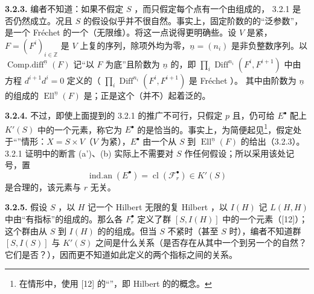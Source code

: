 \textbf{3.2.3.} 编者不知道：如果不假定 $S$ ，而只假定每个点有一个由组成的， 3.2.1 是否仍然成立。况且 $S$ 的假设似乎并不很自然。事实上，固定阶数的的“泛参数”，是一个 Fréchet 的一个（无限维）。将这一点说得更明确些。设 $V$ 是紧，$F=(F^i)_{i\in\mathbb Z}$ 是 $V$ 上复的序列，除项外均为零，$\underline n=(n_i)$ 是非负整数序列。以 $\operatorname{Comp.diff}^{\underline n}(F)$ 记“以 $F$ 为底”且阶数为 $\underline n$ 的，即 $\prod_i\operatorname{Diff}^{n_i}(F^i,F^{i+1})$ 中由方程 $d^{i+1}d^i=0$ 定义的（ $\prod_i\operatorname{Diff}^{n_i}(F^i,F^{i+1})$ 是 Fréchet ）。
其中由阶数为 $\underline n$ 的组成的 $\operatorname{Ell}^{\underline n}(F)$ 是；正是这个（并不）起着泛的。

\textbf{3.2.4.} 不过，即使上面提到的 3.2.1 的推广不可行，只假定 $p$ 且，仍可给 $E^\bullet$ 配上 $K'(S)$ 中的一个元素，称它为 $E^\bullet$ 的是恰当的。事实上，为简便起见\footnote{在情形中，使用 [12] 的“”，即 Hilbert 的的概念。}，假定处于“”情形：$X=S\times V$（$V$ 为紧），$E^\bullet$ 由一个从 $S$ 到 $\operatorname{Ell}^{\underline n}(F)$ 的给出（3.2.3）。3.2.1 证明中的断言 (a')、(b) 实际上不需要对 $S$ 作任何假设；所以采用该处记号，置
\[\operatorname{ind.an}(E^\bullet)=\operatorname{cl}(\mathcal F_r^\bullet)\in K'(S)\]
是合理的，该元素与 $r$ 无关。

\textbf{3.2.5.} 假设 $S$ ，以 $H$ 记一个 Hilbert 无限的复 Hilbert ，以 $I(H)$ 记 $L(H,H)$ 中由“有指标”的组成的。那么各 $F_r^\bullet$ 定义了群 $[S,I(H)]$ 中的一个元素（[12]）；这个群由从 $S$ 到 $I(H)$ 的的组成。但当 $S$ 不紧时（甚至 $S$ 时），编者不知道群 $[S,I(S)]$ 与 $K'(S)$ 之间是什么关系（是否存在从其中一个到另一个的自然？它们是否？），因而更不知道如此定义的两个指标之间的关系。


